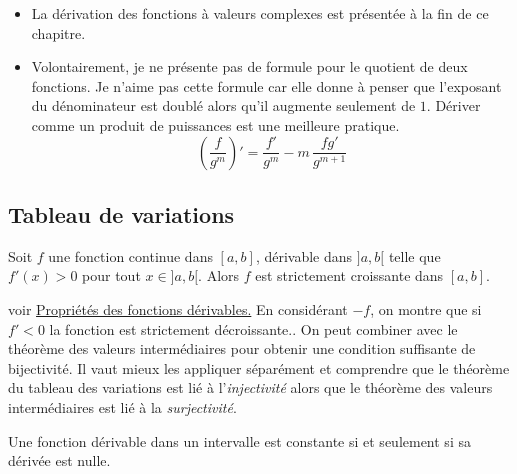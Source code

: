 \begin{rems}
 \begin{itemize}
  \item La dérivation des fonctions à valeurs complexes est présentée à la fin de ce chapitre.
  \item Volontairement, je ne présente pas de formule pour le quotient de deux fonctions. Je n'aime pas cette formule car elle donne à penser que l'exposant du dénominateur est doublé alors qu'il augmente seulement de $1$. Dériver comme un produit de puissances est une meilleure pratique.
  \begin{displaymath}
   (\frac{f}{g^m})' = \frac{f'}{g^m} - m \, \frac{fg'}{g^{m+1}}
  \end{displaymath}
 \end{itemize}
\end{rems}

\subsection{Tableau de variations}
\begin{thm}
 Soit $f$ une fonction continue dans $[a,b]$, dérivable dans $]a,b[$ telle que $f'(x)>0$ pour tout $x\in]a,b[$. Alors $f$ est strictement croissante dans $[a,b]$.
\end{thm}
voir \href{\baseurl C2070.pdf}{Propriétés des fonctions dérivables.} En considérant $-f$, on montre que si $f'<0$ la fonction est strictement décroissante..
On peut combiner avec le théorème des valeurs intermédiaires pour obtenir une condition suffisante de bijectivité. Il vaut mieux les appliquer séparément et comprendre que le théorème du tableau des variations est lié à l'\emph{injectivité} alors que le théorème des valeurs intermédiaires est lié à la \emph{surjectivité}. 
\begin{prop}
 Une fonction dérivable dans un intervalle est constante si et seulement si sa dérivée est nulle.
\end{prop}



